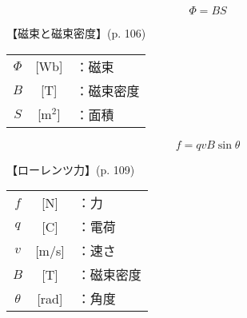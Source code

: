 \documentclass[10pt]{jarticle}
\begin{document}
\newpage
\[
\Phi = B S
\]


\vskip3mm
【磁束と磁束密度】{\footnotesize (p. 106)}

\begin{tabular}{ccl}
$\Phi$	&[Wb]	&：磁束\\
$B$	&[T]	&：磁束密度\\
$S$	&[m$^2$]	&：面積
\end{tabular}





\newpage
\[
f = q v B \sin \theta
\]


\vskip3mm
【ローレンツ力】{\footnotesize (p. 109)}

\begin{tabular}{ccl}
$f$	&[N]	&：力 \\
$q$	&[C]	&：電荷\\
$v$	&[m/s]	&：速さ\\
$B$	&[T]	&：磁束密度\\
$\theta$	&[rad]	&：角度
\end{tabular}
\end{document}
